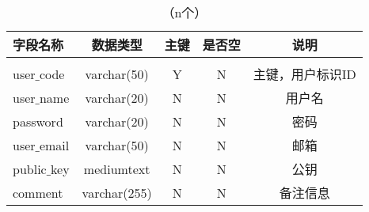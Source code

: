 \begin{table}[tb!]
	\centering
	\caption{（n个）}
	\begin{tabular}{lcccc}
		\toprule
		字段名称      & 数据类型     & 主键 & 是否空 & 说明             \\[1pt]
		\midrule
		\\[-15pt]
		user$\_$code  & varchar(50)  & Y    & N      & 主键，用户标识ID \\
		user$\_$name  & varchar(20)  & N    & N      & 用户名           \\
		password      & varchar(20)  & N    & N      & 密码             \\
		user$\_$email & varchar(50)  & N    & N      & 邮箱             \\
		public$\_$key & mediumtext   & N    & N      & 公钥             \\
		comment       & varchar(255) & N    & N      & 备注信息         \\
		\bottomrule
	\end{tabular}
	\label{table:5-1}
\end{table}

